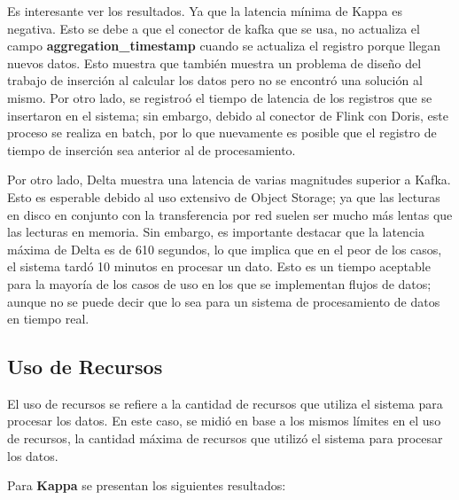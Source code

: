 \newpage

Es interesante ver los resultados. Ya que la latencia mínima de Kappa es negativa. 
Esto se debe a que el conector de kafka que se usa, no actualiza el campo \textbf{aggregation\_timestamp} cuando se actualiza el registro porque llegan nuevos datos.
Esto muestra que también muestra un problema de diseño del trabajo de inserción al calcular los datos pero no se encontró una solución al mismo. 
Por otro lado, se registroó el tiempo de latencia de los registros que se insertaron en el sistema; sin embargo, debido al conector de Flink con Doris, 
este proceso se realiza en batch, por lo que nuevamente es posible que el registro de tiempo de inserción sea anterior al de procesamiento. 

Por otro lado, Delta muestra una latencia de varias magnitudes superior a Kafka. Esto es esperable debido al uso extensivo de Object Storage;
ya que las lecturas en disco en conjunto con la transferencia por red suelen ser mucho más lentas que las lecturas en memoria.
Sin embargo, es importante destacar que la latencia máxima de Delta es de 610 segundos, lo que implica que en el peor de los casos,
el sistema tardó 10 minutos en procesar un dato.
Esto es un tiempo aceptable para la mayoría de los casos de uso en los que se implementan flujos de datos; 
aunque no se puede decir que lo sea para un sistema de procesamiento de datos en tiempo real. 

\newpage
\subsection{Uso de Recursos}

El uso de recursos se refiere a la cantidad de recursos que utiliza el sistema para procesar los datos.
En este caso, se midió en base a los mismos límites en el uso de recursos, la cantidad máxima de recursos que utilizó el sistema para procesar los datos.

Para \textbf{Kappa} se presentan los siguientes resultados:

